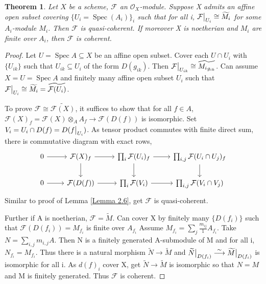 \documentclass{ctexart}
\newtheorem{theorem}{Theorem}[section]
\newcommand{\spec}{\operatorname{Spec}}
\begin{document}
\begin{theorem}
    Let $X$ be a scheme, $\mathcal{F}$ an $\mathcal{O}_{X}$-module.
    Suppose X admits an affine open subset covering $\{U_{i} = \spec(A_{i})\}_{i}$ such that for all i, $\mathcal{F}\big{|}_{U_{i}} \cong \widetilde{M_{i}}$ for some $A_{i}$-module $M_{i}$.
    Then $\mathcal{F}$ is quasi-coherent.
    If moreover X is noetherian and $M_{i}$ are finite over $A_{i}$, then $\mathcal{F}$ is coherent.
    \label{Theorem 6.1} 
\end{theorem}
\begin{proof}
    Let $U = \spec A \subseteq X$ be an affine open subset.
    Cover each $U \cap U_{i}$ with $\{U_{ik}\}$ such that $U_{ik} \subseteq U_{i}$ of the form $D(g_{ik})$.
    Then $\mathcal{F}\big{|}_{U_{ik}} \cong \widetilde{{M_{i}}_{g_{ik}}}$.
    Can assume $X = U = \spec A$ and finitely many affine open subset $U_{i}$ such that $\mathcal{F}\big{|}_{U_{i}} \cong \widetilde{M_{i}} = \widetilde{\mathcal{F}(U_{i})}$.
    \par
    To prove $\mathcal{F} \cong \widetilde{\mathcal{F}(X)}$, it suffices to show that for all $f\in A$, $\mathcal{F}(X)_{f} = \mathcal{F}(X) \otimes_{A} A_{f} \longrightarrow \mathcal{F}(D(f))$ is isomorphic.
    Set $V_{i} = U_{i} \cap D(f) = D(f\big{|}_{U_{i}})$.
    As tensor product commutes with finite direct sum, there is commutative diagram with exact rows,
    \begin{equation*}
        \begin{tikzcd}
            0 \arrow[r] &
            \mathcal{F}(X)_{f} \arrow[r] \arrow[d] &
            \prod_{i} \mathcal{F}(U_{i})_{f} \arrow[r] \arrow[d] &
            \prod_{i,j} \mathcal{F}(U_{i} \cap U_{j})_{f} \arrow[d] \\
            0 \arrow[r] &
            \mathcal{F}(D(f)) \arrow[r] &
            \prod_{i} \mathcal{F}(V_{i}) \arrow[r] &
            \prod_{i,j} \mathcal{F}(V_{i} \cap V_{j})
        \end{tikzcd}
    \end{equation*}
    Similar to proof of Lemma \ref{Lemma 2.6}, get $\mathcal{F}$ is quasi-coherent.
    \par
    Further if A is noetherian, $\mathcal{F} = \widetilde{M}$.
    Can cover X by finitely many $\{D(f_{i})\}$ such that $\mathcal{F}(D(f_{i})) = M_{f_{i}}$ is finite over $A_{f_{i}}$
    Assume $M_{f_{i}} = \sum_{j} \frac{m_{ij}}{1}A_{f_{i}}$.
    Take $N = \sum_{i,j} m_{i,j}A$.
    Then N is a finitely generated A-submodule of M and for all i, $N_{f_{i}} = M_{f_{i}}$.
    Thus there is a natural morphism $\widetilde{N} \longrightarrow \widetilde{M}$ and $\widetilde{N}\big{|}_{D(f_{i})} \overset{\sim}{\longrightarrow} \widetilde{M}\big{|}_{D(f_{i})}$ is isomorphic for all i.
    As $d(f)_{i}$ cover X, get $\widetilde{N} \longrightarrow \widetilde{M}$ is isomorphic so that $N = M$ and M is finitely generated.
    Thus $\mathcal{F}$ is coherent.
\end{proof}
\end{document}

